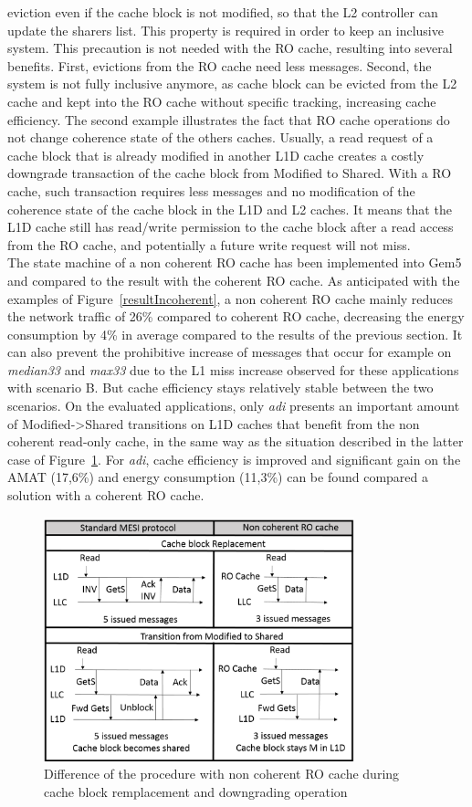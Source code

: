\documentclass[sigconf]{acmart}
\begin{document}
eviction even if the cache block is not modified, so that the L2
controller can update the sharers list. This property is required in
order to keep an inclusive system. This precaution is not needed with
the RO cache, resulting into several benefits. First, evictions from
the RO cache need less messages. Second, the system is not fully
inclusive anymore, as cache block can be evicted from the L2 cache and
kept into the RO cache without specific tracking, increasing
cache efficiency. The second example illustrates the fact that RO
cache operations do not change coherence state of the others
caches. Usually, a read request of a cache block that is already
modified in another L1D cache creates a costly downgrade transaction
of the cache block from Modified to Shared. With a RO cache, such
transaction requires less messages and no modification of the
coherence state of the cache block in the L1D and L2 caches. It means
that the L1D cache still has read/write permission to the cache block
after a read access from the RO cache, and potentially a future write
request will not miss. \\
\indent The state machine of a non coherent RO cache has been implemented into Gem5 and compared to the result with the coherent RO cache. As anticipated with the examples of Figure~\ref{resultIncoherent}, a non
coherent RO cache mainly reduces the network traffic of 26\% compared
to coherent RO cache, decreasing the energy consumption by 4\% in average compared to the results of the previous section. It can also
prevent the prohibitive increase of messages that occur for example on
\textit{median33} and \textit{max33} due to the L1 miss
increase observed for these applications with scenario B. But cache
efficiency stays relatively stable between the two scenarios. On the
evaluated applications, only \textit{adi} presents an important amount
of Modified->Shared transitions on L1D caches that benefit from the
non coherent read-only cache, in the same way as the situation
described in the latter case of Figure~\ref{incoherent}. For
\textit{adi}, cache efficiency is improved and significant gain on the
AMAT (17,6\%) and energy consumption (11,3\%) can be found compared a
solution with a coherent RO cache.

\begin{figure}
    \centering
    \includegraphics[width=9cm]{./images/incoherent.png}
    \caption{Difference of the procedure with non coherent RO cache during  cache block remplacement and downgrading operation}
    \label{incoherent}
\end{figure}
\end{document}
